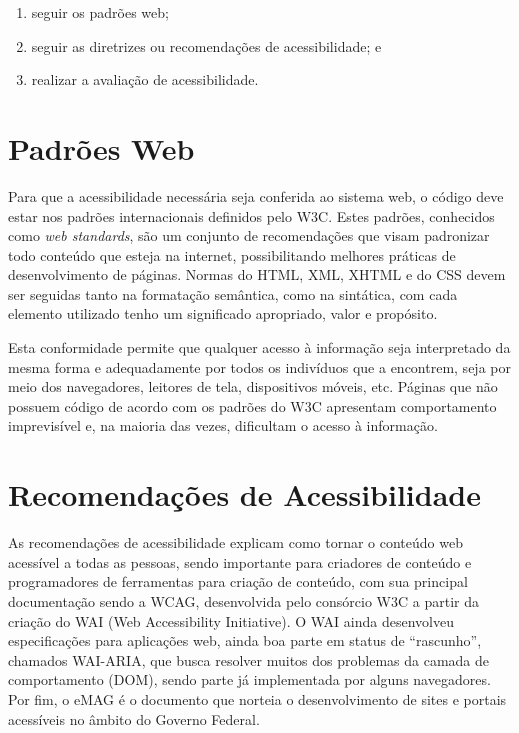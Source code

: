 \documentclass[
  12pt,
  openright,
  twoside,
  a4paper,
  english,
  french,
  spanish,
  brazil
]{abntex2}
\begin{document}
\begin{enumerate}
  \item seguir os padrões web;
  \item seguir as diretrizes ou recomendações de acessibilidade; e
  \item realizar a avaliação de acessibilidade.
\end{enumerate}

\section{Padrões Web}

Para que a acessibilidade necessária seja conferida ao sistema web, o código
deve estar nos padrões internacionais definidos pelo W3C. Estes padrões,
conhecidos como \textit{web standards}, são um conjunto de recomendações que
visam padronizar todo conteúdo que esteja na internet, possibilitando melhores
práticas de desenvolvimento de páginas. Normas do HTML, XML, XHTML e do CSS
devem ser seguidas tanto na formatação semântica, como na sintática, com cada
elemento utilizado tenho um significado apropriado, valor e propósito.

Esta conformidade permite que qualquer acesso à informação seja interpretado da
mesma forma e adequadamente por todos os indivíduos que a encontrem, seja por
meio dos navegadores, leitores de tela, dispositivos móveis, etc. Páginas que
não possuem código de acordo com os padrões do W3C apresentam comportamento
imprevisível e, na maioria das vezes, dificultam o acesso à informação.

\section{Recomendações de Acessibilidade}

As recomendações de acessibilidade explicam como tornar o conteúdo web acessível
a todas as pessoas, sendo importante para criadores de conteúdo e programadores
de ferramentas para criação de conteúdo, com sua principal documentação sendo a
WCAG, desenvolvida pelo consórcio W3C a partir da criação do WAI (Web
Accessibility Initiative). O WAI ainda desenvolveu especificações para
aplicações web, ainda boa parte em status de ``rascunho'', chamados WAI-ARIA,
que busca resolver muitos dos problemas da camada de comportamento (DOM), sendo
parte já implementada por alguns navegadores. Por fim, o eMAG é o documento que
norteia o desenvolvimento de sites e portais acessíveis no âmbito do Governo
Federal.
\end{document}
